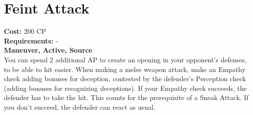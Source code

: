 \section{Feint Attack}
\textbf{Cost:} 200 CP\\
\textbf{Requirements:} -\\
\textbf{Maneuver, Active, Source}\\
You can spend 2 additional AP to create an opening in your opponent’s defenses, to be able to hit easier. When making a melee weapon attack, make an Empathy check adding bonuses for deception, contested by the defender’s Perception check (adding bonuses for recognizing deceptions). If your Empathy check succeeds, the defender has to take the hit. This counts for the prerequisite of a Sneak Attack. If you don’t succeed, the defender can react as usual.\\